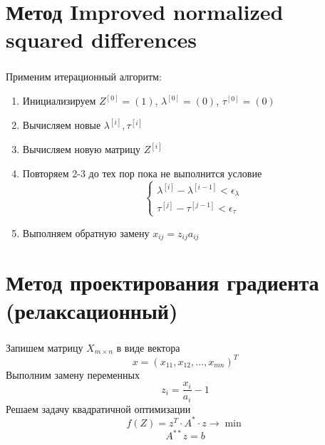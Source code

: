 \documentclass{beamer}
\begin{document}
\section{Метод Improved normalized squared differences}
\begin{frame}
	\frametitle{\insertsection}
	
	Применим итерационный алгоритм:
	\begin{enumerate}
	    \item Инициализируем $Z^{[0]} = (1)$, $\lambda^{[0]} = (0)$, $\tau^{[0]} = (0)$
	    \item Вычисляем новые $\lambda^{[i]}, \tau^{[i]}$
	    \item Вычисляем новую матрицу $Z^{[i]}$
	    \item Повторяем 2-3 до тех пор пока не выполнится условие 
	    $$\begin{cases}
	    \lambda^{[i]} - \lambda^{[i-1]} < \epsilon_\lambda \\ 
	    \tau^{[j]} - \tau^{[j-1]} < \epsilon_\tau
	    \end{cases}$$
	    \item Выполняем обратную замену $x_{ij} = z_{ij}a_{ij}$
	\end{enumerate}
	
\end{frame}

\section{Метод проектирования градиента (релаксационный)}
\begin{frame}
	\frametitle{\insertsection}
	
	Запишем матрицу $X_{m \times n}$ в виде вектора 
	$$x = (x_{11}, x_{12}, \dots, x_{mn})^T$$
	Выполним замену переменных
	$$z_{i} = \frac{x_{i}}{a_{i}} - 1$$
	Решаем задачу квадратичной оптимизации
	$$f(Z) = z^T \cdot A^* \cdot z \to \min$$
	$$A^{**}z=b$$
	
	
\end{frame}
\end{document}
